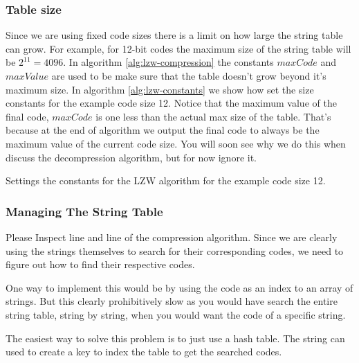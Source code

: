 \begin{refsection}
\subsubsection{Table size}

Since we are using fixed code sizes there is a limit on how large the
string table can grow. For example, for 12-bit codes the maximum size
of the string table will be $2^{11}=4096$. In algorithm
\ref{alg:lzw-compression} the constants $maxCode$ and $maxValue$ are
used to be make sure that the table doesn't grow beyond it's maximum
size. In algorithm \ref{alg:lzw-constants} we show how set the size
constants for the example code size 12. Notice that the maximum value
of the final code, $maxCode$ is one less than the actual max size of
the table. That's because at the end of algorithm we output the final
code to always be the maximum value of the current code size. You will
soon see why we do this when discuss the decompression algorithm, but for
now ignore it.

\begin{algorithm}[H]
  \caption{Settings the constants for the LZW algorithm for the
    example code size 12.}
  \label{alg:lzw-constants}
  \begin{algorithmic}[1]
  \end{algorithmic}
\end{algorithm}

\subsubsection{Managing The String Table}

Please Inspect line
 and line
 of the compression
algorithm. Since we are clearly using the strings themselves to search
for their corresponding codes, we need to figure out how to find their
respective codes.

One way to implement this would be by using the code as an index to an
array of strings. But this clearly prohibitively slow as you would
have search the entire string table, string by string, when you would
want the code of a specific string.

The easiest way to solve this problem is to just use a hash table. The
string can used to create a key to index the table to get the searched
codes.


\end{refsection}
